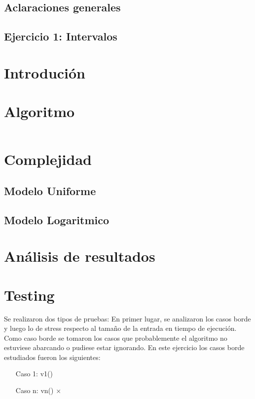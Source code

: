 \documentclass[a4paper, 12pt] {article}
\begin{document}
\begin{center}
\section*{Aclaraciones generales} 
\end{center}

\newpage

\begin{center}
\section*{Ejercicio 1: Intervalos}
\end{center}

\bigskip
\section*{Introduci\'on}

\section*{Algoritmo}

\begin{verbatim}
\end{verbatim}

\section*{Complejidad}

\subsection*{Modelo Uniforme}

\subsection*{Modelo Logaritmico}

\section*{An\'alisis de resultados}

\section*{Testing}
Se realizaron dos tipos de pruebas: En primer lugar, se analizaron los casos borde y luego lo de stress respecto al tama\~{n}o de la entrada en tiempo de ejecuci\'on.
Como caso borde se tomaron los casos que probablemente el algoritmo no estuviese abarcando o pudiese estar ignorando.
En este ejercicio los casos borde estudiados fueron los siguientes:
\begin{itemize}
\item[Caso 1:] v1()
\item[Caso n:] vn()
 ×
\end{itemize}
\end{document}
